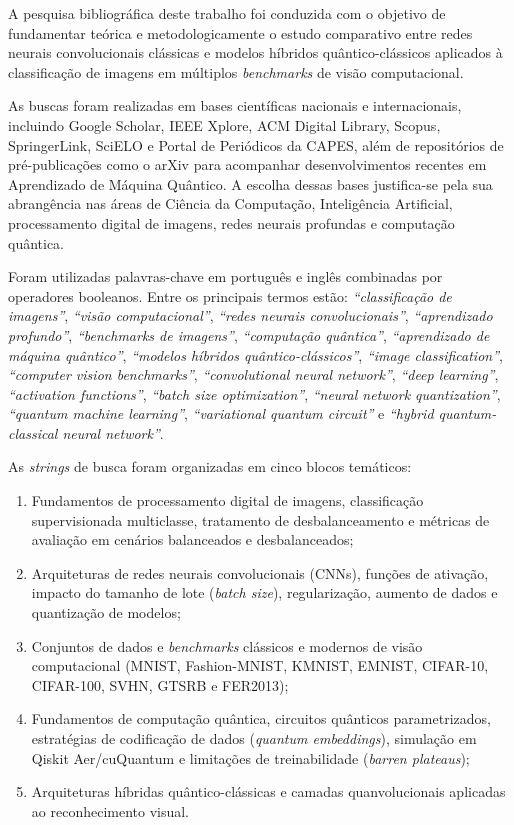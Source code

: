 \documentclass[
    12pt,
    openright,
    oneside,
    a4paper,
    english,
    brazil
]{abntex2}
\begin{document}
A pesquisa bibliográfica deste trabalho foi conduzida com o objetivo de fundamentar teórica e metodologicamente o estudo comparativo entre redes neurais convolucionais clássicas e modelos híbridos quântico-clássicos aplicados à classificação de imagens em múltiplos \textit{benchmarks} de visão computacional.

As buscas foram realizadas em bases científicas nacionais e internacionais, incluindo Google Scholar, IEEE Xplore, ACM Digital Library, Scopus, SpringerLink, SciELO e Portal de Periódicos da CAPES, além de repositórios de pré-publicações como o arXiv para acompanhar desenvolvimentos recentes em Aprendizado de Máquina Quântico. A escolha dessas bases justifica-se pela sua abrangência nas áreas de Ciência da Computação, Inteligência Artificial, processamento digital de imagens, redes neurais profundas e computação quântica.

Foram utilizadas palavras-chave em português e inglês combinadas por operadores booleanos. Entre os principais termos estão: \textit{``classificação de imagens''}, \textit{``visão computacional''}, \textit{``redes neurais convolucionais''}, \textit{``aprendizado profundo''}, \textit{``benchmarks de imagens''}, \textit{``computação quântica''}, \textit{``aprendizado de máquina quântico''}, \textit{``modelos híbridos quântico-clássicos''}, \textit{``image classification''}, \textit{``computer vision benchmarks''}, \textit{``convolutional neural network''}, \textit{``deep learning''}, \textit{``activation functions''}, \textit{``batch size optimization''}, \textit{``neural network quantization''}, \textit{``quantum machine learning''}, \textit{``variational quantum circuit''} e \textit{``hybrid quantum-classical neural network''}.

As \textit{strings} de busca foram organizadas em cinco blocos temáticos:
\begin{enumerate}
    \item Fundamentos de processamento digital de imagens, classificação supervisionada multiclasse, tratamento de desbalanceamento e métricas de avaliação em cenários balanceados e desbalanceados;
    \item Arquiteturas de redes neurais convolucionais (CNNs), funções de ativação, impacto do tamanho de lote (\textit{batch size}), regularização, aumento de dados e quantização de modelos;
    \item Conjuntos de dados e \textit{benchmarks} clássicos e modernos de visão computacional (MNIST, Fashion-MNIST, KMNIST, EMNIST, CIFAR-10, CIFAR-100, SVHN, GTSRB e FER2013);
    \item Fundamentos de computação quântica, circuitos quânticos parametrizados, estratégias de codificação de dados (\textit{quantum embeddings}), simulação em Qiskit Aer/cuQuantum e limitações de treinabilidade (\textit{barren plateaus});
    \item Arquiteturas híbridas quântico-clássicas e camadas quanvolucionais aplicadas ao reconhecimento visual.
\end{enumerate}
\end{document}
